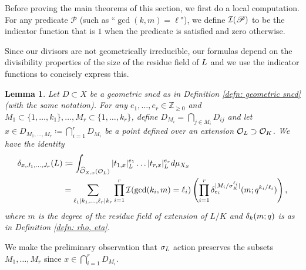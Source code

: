 \documentclass[10pt]{article}
\theoremstyle{plain}
\newtheorem{lemma}[theorem]{Lemma}
\theoremstyle{definition}
\numberwithin{equation}{section}
\begin{document}
Before proving the main theorems of this section, we first do a local computation. For any predicate $\mathscr P$ (such as ``$\gcd(k,m) = \ell$"), we define ${\mathcal I}(\mathscr P)$ to be the indicator function that is $1$ when the predicate is satisfied and zero otherwise.

Since our divisors are not geometrically irreducible, our formulas depend on the divisibility properties of the size of the residue field of ${L}$ and we use the indicator functions to concisely express this.

\begin{lemma}\label{lemma: local integrals}
Let $D \subset X$ be a geometric sncd as in Definition \ref{defn: geometric sncd} (with the same notation).  For any $e_1,\dots,e_r \in \mathbb Z_{\geq 0}$ and $M_1 \subset \{1,\dots,k_1\},\dots, M_r \subset \{1,\dots,k_r\}$, define $D_{M_i} = \bigcap_{j \in M_i}D_{ij}$ and let $x \in D_{M_1,\dots,M_r} \coloneqq \bigcap_{i=1}^rD_{M_i}$ be a point defined over an extension ${{\mathcal O}_{L}} \supset { {\mathcal O} _{K}}$.  We have the identity
\begin{align*}
    \delta_{x,J_1,\dots,J_r}({L}) &\coloneqq \int_{\widehat{{\mathcal O}}_{X,x}({{\mathcal O}_{L}})}|t_{1,x}|_{{L}}^{e_1}\dots |t_{r,x}|_{{L}}^{e_r}d\mu_{X_{S}}\\
    &= \sum_{\ell_1|k_1,\dots,\ell_r|k_r}\prod_{i=1}^r{\mathcal I}(\gcd(k_i,m)=\ell_i)\left(\prod_{i=1}^r\delta_{e_i}^{|M_i/\sigma_K^{\ell_i}|}(m;q^{k_i/\ell_i})\right),
\end{align*}
where $m$ is the degree of the residue field of extension of $L/K$ and $\delta_k(m;q)$ is as in Definition \ref{defn: rho, eta}.
\end{lemma}

We make the preliminary observation that $\sigma_{L}$ action preserves the subsets $M_1,\dots,M_r$ since $x \in \bigcap_{i=1}^rD_{M_i}$.
\end{document}
